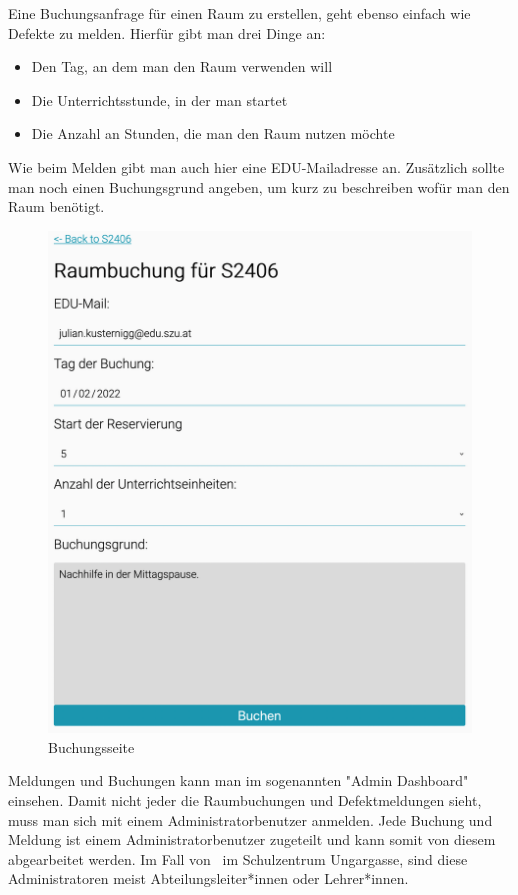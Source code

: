 Eine Buchungsanfrage für einen Raum zu erstellen, geht ebenso einfach wie Defekte zu melden. Hierfür gibt man drei Dinge an: 
\begin{itemize}
    \item Den Tag, an dem man den Raum verwenden will
    \item Die Unterrichtsstunde, in der man startet
    \item Die Anzahl an Stunden, die man den Raum nutzen möchte
\end{itemize} 
Wie beim Melden gibt man auch hier eine EDU-Mailadresse an. Zusätzlich sollte man noch einen Buchungsgrund angeben, um kurz zu beschreiben wofür man den Raum benötigt.

\begin{figure}[H]
    \centering
    \includegraphics[width=120mm]{media/WebComponents/Buchungsseite_light.png}
    \caption{Buchungsseite}
\end{figure}


\label{sec:webcomplogdash}

Meldungen und Buchungen kann man im sogenannten "Admin Dashboard" einsehen. Damit nicht jeder die Raumbuchungen und Defektmeldungen sieht, muss man sich mit einem Administratorbenutzer anmelden. Jede Buchung und Meldung ist einem Administratorbenutzer zugeteilt und kann somit von diesem abgearbeitet werden. Im Fall von \ZELIA\ im Schulzentrum Ungargasse, sind diese Administratoren meist Abteilungsleiter*innen oder Lehrer*innen.

